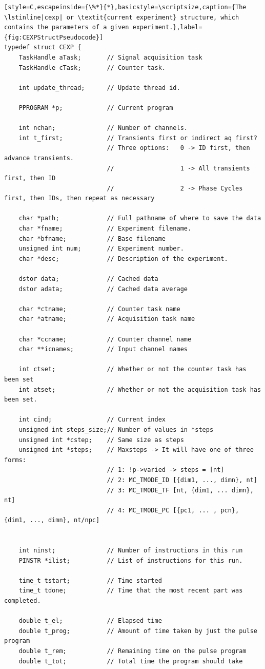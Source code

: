\documentclass[PaulGanssle-Thesis.tex]{subfiles}
\begin{document}
\begin{lstlisting}[style=C,escapeinside={\%*}{*},basicstyle=\scriptsize,caption={The \lstinline|cexp| or \textit{current experiment} structure, which contains the parameters of a given experiment.},label={fig:CEXPStructPseudocode}]
typedef struct CEXP {
	TaskHandle aTask; 		// Signal acquisition task
	TaskHandle cTask;		// Counter task.

	int update_thread;		// Update thread id.
	
	PPROGRAM *p;			// Current program
	
	int nchan;				// Number of channels.
	int t_first;			// Transients first or indirect aq first?
							// Three options: 	0 -> ID first, then advance transients.
							//					1 -> All transients first, then ID
							//					2 -> Phase Cycles first, then IDs, then repeat as necessary
	
	char *path;				// Full pathname of where to save the data
	char *fname;			// Experiment filename.
	char *bfname;			// Base filename
	unsigned int num;		// Experiment number. 
	char *desc;				// Description of the experiment.
	
	dstor data;				// Cached data
	dstor adata;			// Cached data average
	
	char *ctname;			// Counter task name
	char *atname;			// Acquisition task name
	
	char *ccname; 			// Counter channel name
	char **icnames; 		// Input channel names
	
	int ctset;				// Whether or not the counter task has been set
	int atset;				// Whether or not the acquisition task has been set.

	int cind;				// Current index
	unsigned int steps_size;// Number of values in *steps
	unsigned int *cstep;	// Same size as steps
	unsigned int *steps;	// Maxsteps -> It will have one of three forms:
							// 1: !p->varied -> steps = [nt]
							// 2: MC_TMODE_ID [{dim1, ..., dimn}, nt]
							// 3: MC_TMODE_TF [nt, {dim1, ... dimn}, nt]
							// 4: MC_TMODE_PC [{pc1, ... , pcn}, {dim1, ..., dimn}, nt/npc]

							
	int ninst;				// Number of instructions in this run
	PINSTR *ilist;			// List of instructions for this run.

	time_t tstart;			// Time started
	time_t tdone; 			// Time that the most recent part was completed.
	
	double t_el;			// Elapsed time
	double t_prog;			// Amount of time taken by just the pulse program
	double t_rem;			// Remaining time on the pulse program
	double t_tot;			// Total time the program should take
	

\end{lstlisting}
\end{document}
